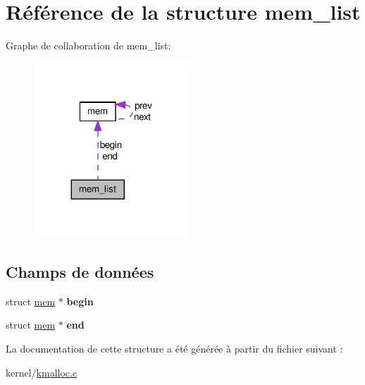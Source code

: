 \hypertarget{structmem__list}{\section{\-Référence de la structure mem\-\_\-list}
\label{structmem__list}
}


\-Graphe de collaboration de mem\-\_\-list\-:\nopagebreak
\begin{figure}[H]
\begin{center}
\leavevmode
\includegraphics[width=167pt]{structmem__list__coll__graph}
\end{center}
\end{figure}
\subsection*{\-Champs de données}
\begin{DoxyCompactItemize}
\item 
\hypertarget{structmem__list_a553c3121bc3eb64cb30d5cda16edb629}{struct \hyperlink{structmem}{mem} $\ast$ {\bfseries begin}}\label{structmem__list_a553c3121bc3eb64cb30d5cda16edb629}

\item 
\hypertarget{structmem__list_a2e221a43fa8f185dda7f582fbb4c507f}{struct \hyperlink{structmem}{mem} $\ast$ {\bfseries end}}\label{structmem__list_a2e221a43fa8f185dda7f582fbb4c507f}

\end{DoxyCompactItemize}


\-La documentation de cette structure a été générée à partir du fichier suivant \-:\begin{DoxyCompactItemize}
\item 
kernel/\hyperlink{kmalloc_8c}{kmalloc.\-c}\end{DoxyCompactItemize}

